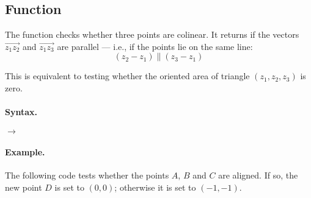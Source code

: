 \subsection{Function }
\label{sub:function_islinear}

The function   checks whether three points are colinear. It returns  if the vectors $\overrightarrow{z_1z_2}$ and $\overrightarrow{z_1z_3}$ are parallel — i.e., if the points lie on the same line:
\[
(z_2 - z_1) \parallel (z_3 - z_1)
\]

This is equivalent to testing whether the oriented area of triangle $(z_1, z_2, z_3)$ is zero.

\paragraph{Syntax.}
\begin{center}
 $\rightarrow$ 
\end{center}

\paragraph{Example.}
The following code tests whether the points $A$, $B$ and $C$ are aligned. If so, the new point $D$ is set to $(0, 0)$; otherwise it is set to $(-1, -1)$.

\begin{minipage}{0.48\textwidth}
\begin{tkzexample}
\end{tkzexample}

\begin{tkzexample}
\end{tkzexample}
\end{minipage}
\hfill
\begin{minipage}{0.48\textwidth}
\begin{center}
\end{center}
\end{minipage}

